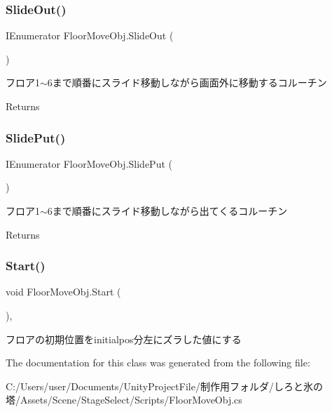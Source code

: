 \subsubsection{\texorpdfstring{Slide\+Out()}{SlideOut()}}
{\footnotesize\ttfamily I\+Enumerator Floor\+Move\+Obj.\+Slide\+Out (\begin{DoxyParamCaption}{ }\end{DoxyParamCaption})\hspace{0.3cm}{\ttfamily [inline]}}



フロア1$\sim$6まで順番にスライド移動しながら画面外に移動するコルーチン 

\begin{DoxyReturn}{Returns}

\end{DoxyReturn}
\mbox{\label{class_floor_move_obj_a2952b0fa6b0cea5e88ddd03ca07c82ec}} 
\subsubsection{\texorpdfstring{Slide\+Put()}{SlidePut()}}
{\footnotesize\ttfamily I\+Enumerator Floor\+Move\+Obj.\+Slide\+Put (\begin{DoxyParamCaption}{ }\end{DoxyParamCaption})\hspace{0.3cm}{\ttfamily [inline]}}



フロア1$\sim$6まで順番にスライド移動しながら出てくるコルーチン 

\begin{DoxyReturn}{Returns}

\end{DoxyReturn}
\mbox{\label{class_floor_move_obj_a59c1e0eb2b520cc42ad34159eacb9e32}} 
\subsubsection{\texorpdfstring{Start()}{Start()}}
{\footnotesize\ttfamily void Floor\+Move\+Obj.\+Start (\begin{DoxyParamCaption}{ }\end{DoxyParamCaption})\hspace{0.3cm}{\ttfamily [inline]}, {\ttfamily [private]}}



フロアの初期位置をinitialpos分左にズラした値にする 



The documentation for this class was generated from the following file\+:\begin{DoxyCompactItemize}
\item 
C\+:/\+Users/user/\+Documents/\+Unity\+Project\+File/制作用フォルダ/しろと氷の塔/\+Assets/\+Scene/\+Stage\+Select/\+Scripts/Floor\+Move\+Obj.\+cs\end{DoxyCompactItemize}
